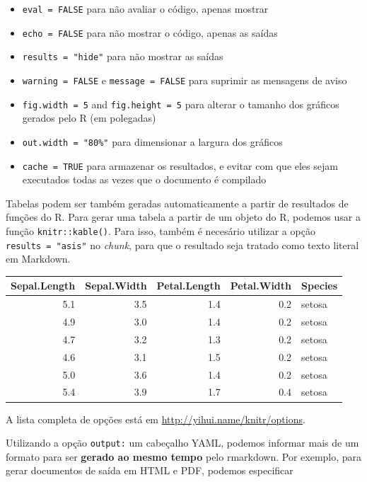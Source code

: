 \documentclass[
  10pt,
  a4paper]{book}
\providecommand{\tightlist}{%
  \setlength{\itemsep}{0pt}\setlength{\parskip}{0pt}}
\begin{document}
\begin{itemize}
\tightlist
\item
  \texttt{eval\ =\ FALSE} para não avaliar o código, apenas mostrar
\item
  \texttt{echo\ =\ FALSE} para não mostrar o código, apenas as saídas
\item
  \texttt{results\ =\ "hide"} para não mostrar as saídas
\item
  \texttt{warning\ =\ FALSE} e \texttt{message\ =\ FALSE} para suprimir as mensagens de
  aviso
\item
  \texttt{fig.width\ =\ 5} and \texttt{fig.height\ =\ 5} para alterar o tamanho dos
  gráficos gerados pelo R (em polegadas)
\item
  \texttt{out.width\ =\ "80\%"} para dimensionar a largura dos gráficos
\item
  \texttt{cache\ =\ TRUE} para armazenar os resultados, e evitar com que eles
  sejam executados todas as vezes que o documento é compilado
\end{itemize}

Tabelas podem ser também geradas automaticamente a partir de resultados
de funções do R. Para gerar uma tabela a partir de um objeto do R,
podemos usar a função \texttt{knitr::kable()}. Para isso, também é necesário
utilizar a opção \texttt{results\ =\ "asis"} no \emph{chunk}, para que o resultado
seja tratado como texto literal em Markdown.

\begin{tabular}{r|r|r|r|l}
\hline
Sepal.Length & Sepal.Width & Petal.Length & Petal.Width & Species\\
\hline
5.1 & 3.5 & 1.4 & 0.2 & setosa\\
\hline
4.9 & 3.0 & 1.4 & 0.2 & setosa\\
\hline
4.7 & 3.2 & 1.3 & 0.2 & setosa\\
\hline
4.6 & 3.1 & 1.5 & 0.2 & setosa\\
\hline
5.0 & 3.6 & 1.4 & 0.2 & setosa\\
\hline
5.4 & 3.9 & 1.7 & 0.4 & setosa\\
\hline
\end{tabular}

A lista completa de opções está em \url{http://yihui.name/knitr/options}.

Utilizando a opção \texttt{output:} um cabeçalho YAML, podemos informar mais de
um formato para ser \textbf{gerado ao mesmo tempo} pelo rmarkdown. Por
exemplo, para gerar documentos de saída em HTML e PDF, podemos
especificar
\end{document}
